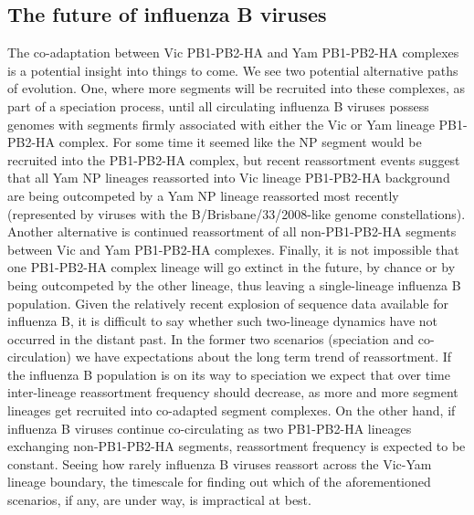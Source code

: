 \documentclass[11pt,oneside,letterpaper]{article}
\begin{document}
\subsection*{The future of influenza B viruses}
The co-adaptation between Vic PB1-PB2-HA and Yam PB1-PB2-HA complexes is a potential insight into things to come.
We see two potential alternative paths of evolution.
One, where more segments will be recruited into these complexes, as part of a speciation process, until all circulating influenza B viruses possess genomes with segments firmly associated with either the Vic or Yam lineage PB1-PB2-HA complex.
For some time it seemed like the NP segment would be recruited into the PB1-PB2-HA complex, but recent reassortment events suggest that all Yam NP lineages reassorted into Vic lineage PB1-PB2-HA background are being outcompeted by a Yam NP lineage reassorted most recently (represented by viruses with the B/Brisbane/33/2008-like genome constellations).
Another alternative is continued reassortment of all non-PB1-PB2-HA segments between Vic and Yam PB1-PB2-HA complexes.
Finally, it is not impossible that one PB1-PB2-HA complex lineage will go extinct in the future, by chance or by being outcompeted by the other lineage, thus leaving a single-lineage influenza B population.
Given the relatively recent explosion of sequence data available for influenza B, it is difficult to say whether such two-lineage dynamics have not occurred in the distant past.
In the former two scenarios (speciation and co-circulation) we have expectations about the long term trend of reassortment.
If the influenza B population is on its way to speciation we expect that over time inter-lineage reassortment frequency should decrease, as more and more segment lineages get recruited into co-adapted segment complexes.
On the other hand, if influenza B viruses continue co-circulating as two PB1-PB2-HA lineages exchanging non-PB1-PB2-HA segments, reassortment frequency is expected to be constant.
Seeing how rarely influenza B viruses reassort across the Vic-Yam lineage boundary, the timescale for finding out which of the aforementioned scenarios, if any, are under way, is impractical at best.
\end{document}
